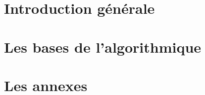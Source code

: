 \documentclass[a4paper,doubleside,11pt]{book}
\begin{document}

	
	
	

	\part{Introduction générale}	
		
		
		

	\part{Les bases de l'algorithmique}
		

			


	
	\part{Les annexes}
		
	
\end{document}
